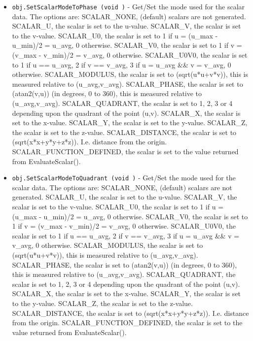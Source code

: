 \begin{itemize}
\item  \verb|obj.SetScalarModeToPhase (void )| -  Get/Set the mode used for the scalar data.  The options are:
 SCALAR\_NONE, (default) scalars are not generated.
 SCALAR\_U, the scalar is set to the u-value. 
 SCALAR\_V, the scalar is set to the v-value.
 SCALAR\_U0, the scalar is set to 1 if u = (u\_max - u\_min)/2 = u\_avg, 0 otherwise.
 SCALAR\_V0, the scalar is set to 1 if v = (v\_max - v\_min)/2 = v\_avg, 0 otherwise.
 SCALAR\_U0V0, the scalar is 
   set to 1 if u == u\_avg, 2 if v == v\_avg, 3 if u = u\_avg \&\& v = v\_avg, 0 otherwise.
 SCALAR\_MODULUS, the scalar is set to (sqrt(u*u+v*v)), this is measured relative to (u\_avg,v\_avg).
 SCALAR\_PHASE, the scalar is set to (atan2(v,u)) (in degrees, 0 to 360), this is measured relative to (u\_avg,v\_avg).
 SCALAR\_QUADRANT, the scalar is set to 1, 2, 3 or 4 
   depending upon the quadrant of the point (u,v).
 SCALAR\_X, the scalar is set to the x-value. 
 SCALAR\_Y, the scalar is set to the y-value. 
 SCALAR\_Z, the scalar is set to the z-value. 
 SCALAR\_DISTANCE, the scalar is set to (sqrt(x*x+y*y+z*z)). I.e. distance from the origin.
 SCALAR\_FUNCTION\_DEFINED, the scalar is set to the value returned from EvaluateScalar().

\item  \verb|obj.SetScalarModeToQuadrant (void )| -  Get/Set the mode used for the scalar data.  The options are:
 SCALAR\_NONE, (default) scalars are not generated.
 SCALAR\_U, the scalar is set to the u-value. 
 SCALAR\_V, the scalar is set to the v-value.
 SCALAR\_U0, the scalar is set to 1 if u = (u\_max - u\_min)/2 = u\_avg, 0 otherwise.
 SCALAR\_V0, the scalar is set to 1 if v = (v\_max - v\_min)/2 = v\_avg, 0 otherwise.
 SCALAR\_U0V0, the scalar is 
   set to 1 if u == u\_avg, 2 if v == v\_avg, 3 if u = u\_avg \&\& v = v\_avg, 0 otherwise.
 SCALAR\_MODULUS, the scalar is set to (sqrt(u*u+v*v)), this is measured relative to (u\_avg,v\_avg).
 SCALAR\_PHASE, the scalar is set to (atan2(v,u)) (in degrees, 0 to 360), this is measured relative to (u\_avg,v\_avg).
 SCALAR\_QUADRANT, the scalar is set to 1, 2, 3 or 4 
   depending upon the quadrant of the point (u,v).
 SCALAR\_X, the scalar is set to the x-value. 
 SCALAR\_Y, the scalar is set to the y-value. 
 SCALAR\_Z, the scalar is set to the z-value. 
 SCALAR\_DISTANCE, the scalar is set to (sqrt(x*x+y*y+z*z)). I.e. distance from the origin.
 SCALAR\_FUNCTION\_DEFINED, the scalar is set to the value returned from EvaluateScalar().


\end{itemize}
